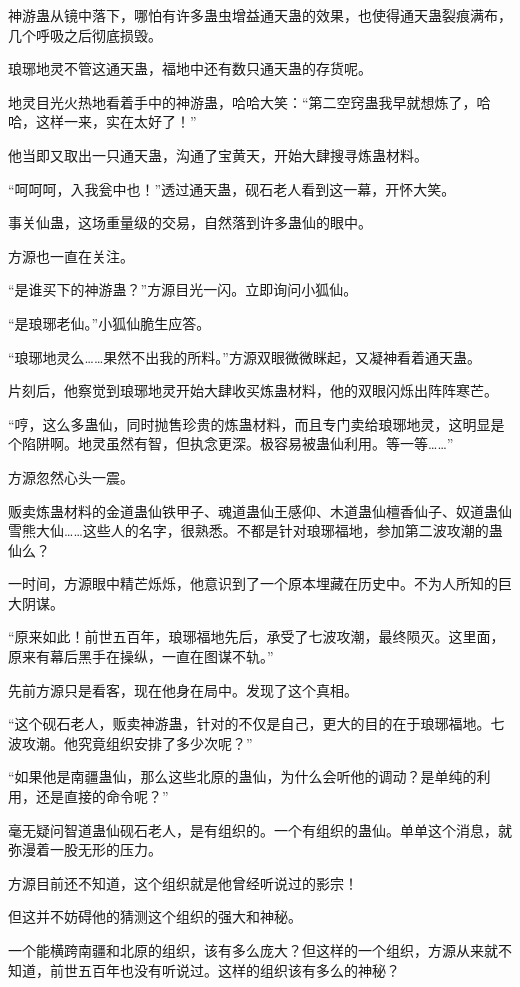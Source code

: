 \begin{this_body}
神游蛊从镜中落下，哪怕有许多蛊虫增益通天蛊的效果，也使得通天蛊裂痕满布，几个呼吸之后彻底损毁。

琅琊地灵不管这通天蛊，福地中还有数只通天蛊的存货呢。

地灵目光火热地看着手中的神游蛊，哈哈大笑：“第二空窍蛊我早就想炼了，哈哈，这样一来，实在太好了！”

他当即又取出一只通天蛊，沟通了宝黄天，开始大肆搜寻炼蛊材料。

“呵呵呵，入我瓮中也！”透过通天蛊，砚石老人看到这一幕，开怀大笑。

事关仙蛊，这场重量级的交易，自然落到许多蛊仙的眼中。

方源也一直在关注。

“是谁买下的神游蛊？”方源目光一闪。立即询问小狐仙。

“是琅琊老仙。”小狐仙脆生应答。

“琅琊地灵么……果然不出我的所料。”方源双眼微微眯起，又凝神看着通天蛊。

片刻后，他察觉到琅琊地灵开始大肆收买炼蛊材料，他的双眼闪烁出阵阵寒芒。

“哼，这么多蛊仙，同时抛售珍贵的炼蛊材料，而且专门卖给琅琊地灵，这明显是个陷阱啊。地灵虽然有智，但执念更深。极容易被蛊仙利用。等一等……”

方源忽然心头一震。

贩卖炼蛊材料的金道蛊仙铁甲子、魂道蛊仙王感仰、木道蛊仙檀香仙子、奴道蛊仙雪熊大仙……这些人的名字，很熟悉。不都是针对琅琊福地，参加第二波攻潮的蛊仙么？

一时间，方源眼中精芒烁烁，他意识到了一个原本埋藏在历史中。不为人所知的巨大阴谋。

“原来如此！前世五百年，琅琊福地先后，承受了七波攻潮，最终陨灭。这里面，原来有幕后黑手在操纵，一直在图谋不轨。”

先前方源只是看客，现在他身在局中。发现了这个真相。

“这个砚石老人，贩卖神游蛊，针对的不仅是自己，更大的目的在于琅琊福地。七波攻潮。他究竟组织安排了多少次呢？”

“如果他是南疆蛊仙，那么这些北原的蛊仙，为什么会听他的调动？是单纯的利用，还是直接的命令呢？”

毫无疑问智道蛊仙砚石老人，是有组织的。一个有组织的蛊仙。单单这个消息，就弥漫着一股无形的压力。

方源目前还不知道，这个组织就是他曾经听说过的影宗！

但这并不妨碍他的猜测这个组织的强大和神秘。

一个能横跨南疆和北原的组织，该有多么庞大？但这样的一个组织，方源从来就不知道，前世五百年也没有听说过。这样的组织该有多么的神秘？


\end{this_body}
